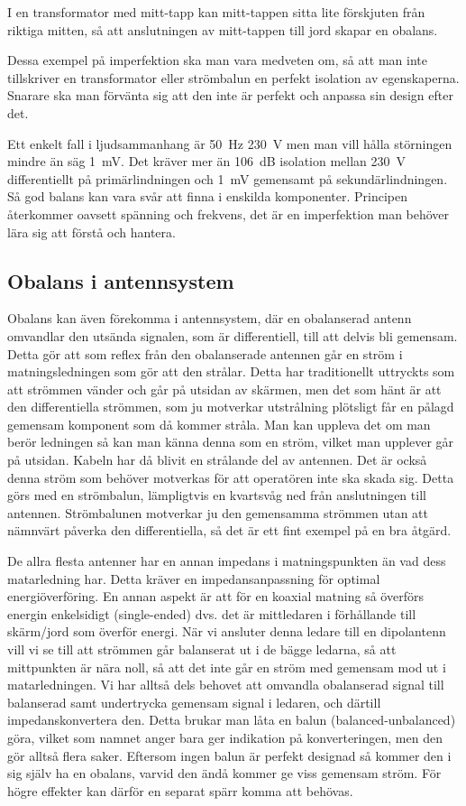 I en transformator med mitt-tapp kan mitt-tappen sitta lite förskjuten från
riktiga mitten, så att anslutningen av mitt-tappen till jord skapar en
obalans.

Dessa exempel på imperfektion ska man vara medveten om, så att man inte
tillskriver en transformator eller strömbalun en perfekt isolation av
egenskaperna. Snarare ska man förvänta sig att den inte är perfekt och
anpassa sin design efter det.

Ett enkelt fall i ljudsammanhang är 50~Hz 230~V men man vill hålla störningen
mindre än säg 1~mV. Det kräver mer än 106~dB isolation mellan 230~V
differentiellt på primärlindningen och 1~mV gemensamt på sekundärlindningen.
Så god balans kan vara svår att finna i enskilda komponenter. Principen
återkommer oavsett spänning och frekvens, det är en imperfektion man behöver
lära sig att förstå och hantera.

\subsection{Obalans i antennsystem}

Obalans kan även förekomma i antennsystem, där en obalanserad antenn omvandlar
den utsända signalen, som är differentiell, till att delvis bli gemensam.
Detta gör att som reflex från den obalanserade antennen går en ström i
matningsledningen som gör att den strålar. Detta har traditionellt uttryckts
som att strömmen vänder och går på utsidan av skärmen, men det som hänt är att
den differentiella strömmen, som ju motverkar utstrålning plötsligt får en
pålagd gemensam komponent som då kommer stråla. Man kan uppleva det om man
berör ledningen så kan man känna denna som en ström, vilket man upplever går
på utsidan. Kabeln har då blivit en strålande del av antennen. Det är också
denna ström som behöver motverkas för att operatören inte ska skada sig.
Detta görs med en strömbalun, lämpligtvis en kvartsvåg ned från anslutningen
till antennen. Strömbalunen motverkar ju den gemensamma strömmen utan att
nämnvärt påverka den differentiella, så det är ett fint exempel på en bra
åtgärd.

De allra flesta antenner har en annan impedans i matningspunkten än vad dess
matarledning har. Detta kräver en impedansanpassning för optimal
energiöverföring. En annan aspekt är att för en koaxial matning så överförs
energin enkelsidigt (single-ended) dvs. det är mittledaren i förhållande till
skärm/jord som överför energi. När vi ansluter denna ledare till en dipolantenn
vill vi se till att strömmen går balanserat ut i de bägge ledarna,
så att mittpunkten är nära noll, så att det inte går en ström med gemensam
mod ut i matarledningen. Vi har alltså dels behovet att omvandla obalanserad
signal till balanserad samt undertrycka gemensam signal i ledaren, och därtill
impedanskonvertera den. Detta brukar man låta en balun (balanced-unbalanced)
göra, vilket som namnet anger bara ger indikation på konverteringen, men den
gör alltså flera saker. Eftersom ingen balun är perfekt designad så kommer
den i sig själv ha en obalans, varvid den ändå kommer ge viss gemensam ström.
För högre effekter kan därför en separat spärr komma att behövas.

